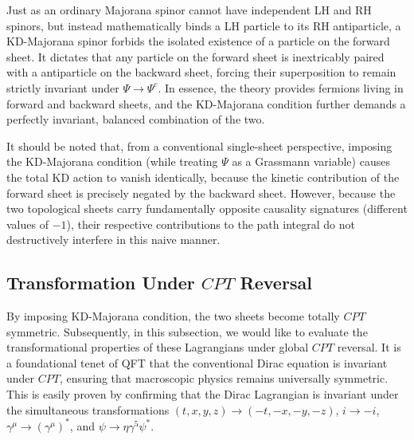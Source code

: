

Just as an ordinary Majorana spinor cannot have independent LH and RH spinors, but instead mathematically binds a LH particle to its RH antiparticle, a KD-Majorana spinor forbids the isolated existence of a particle on the forward sheet. It dictates that any particle on the forward sheet is inextricably paired with a antiparticle on the backward sheet, forcing their superposition to remain strictly invariant under $\Psi \to \Psi^c$. In essence, the theory provides fermions living in forward and backward sheets, and the KD-Majorana condition further demands a perfectly invariant, balanced combination of the two. 

It should be noted that, from a conventional single-sheet perspective, imposing the KD-Majorana condition (while treating $\Psi$ as a Grassmann variable) causes the total KD action to vanish identically, because the kinetic contribution of the forward sheet is precisely negated by the backward sheet. However, because the two topological sheets carry fundamentally opposite causality signatures (different values of $-1$), their respective contributions to the path integral do not destructively interfere in this naive manner. 

\subsection{Transformation Under $CPT$ Reversal}

By imposing KD-Majorana condition, the two sheets become totally $CPT$ symmetric. Subsequently, in this subsection, we would like to evaluate the transformational properties of these Lagrangians under global $CPT$ reversal. It is a foundational tenet of QFT that the conventional Dirac equation is invariant under $CPT$, ensuring that macroscopic physics remains universally symmetric. This is easily proven by confirming that the Dirac Lagrangian is invariant under the simultaneous transformations $(t,x,y,z)\to (-t,-x,-y,-z)$, $i\to -i$, $\gamma^\mu \to (\gamma^\mu)^*$, and $\psi\to \eta \gamma^5 \psi^*$. 

